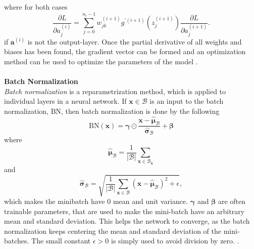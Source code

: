 \documentclass[./main.tex]{subfiles}
\begin{document}
where for both cases
$$ \frac{\partial L}{\partial a_j ^{(i)}} = \sum_{j = 0} ^{n_i - 1} w_{jk} ^{(i + 1)} g^{\prime (i + 1)} \left( z_j ^{(i + 1)} \right) \frac{\partial L}{\partial a_j ^{(i + 1)}}.$$
if $\bm{a}^{(i)}$ is not the output-layer. Once the partial derivative of all weights and biases has been found, the gradient vector can be formed and an optimization method can be used to optimize the parameters of the model \cite{3b1b_4}.
\\
\\
\textbf{Batch Normalization} \\
\textit{Batch normalization} is a reparametrization method, which is applied to individual layers in a neural network. If $\bm{x} \in \mathcal{B}$ is an input to the batch normalization, $\text{BN}$, then batch normalization is done by the following
$$\text{BN}(\bm{x}) = \bm{\gamma} \odot \frac{\bm{x} - \hat{\bm{\mu}}_{\mathcal{B}}}{\hat{\bm{\sigma}}_{\mathcal{B}}} + \bm{\beta}$$
where
$$\hat{\bm{\mu}}_{\mathcal{B}} = \frac{1}{|\mathcal{B}|} \sum_{\bm{x} \in \mathcal{B}_{\bm{x}}}$$
and
$$\hat{\bm{\sigma}}_{\mathcal{B}} = \sqrt{\frac{1}{|\mathcal{B}|} \sum_{\bm{x} \in \mathcal{B}} \left(\bm{x} - \hat{\bm{\mu}}_{\mathcal{B}} \right)^2 + \epsilon},$$
which makes the minibatch have $0$ mean and unit variance. $\bm{\gamma}$ and $\bm{\beta}$ are often trainable parameters, that are used to make the mini-batch have an arbitrary mean and standard deviation. This helps the network to converge, as the batch normalization keeps centering the mean and standard deviation of the mini-batches. The small constant $\epsilon > 0$ is simply used to avoid division by zero. \cite{d2l}.
\end{document}
